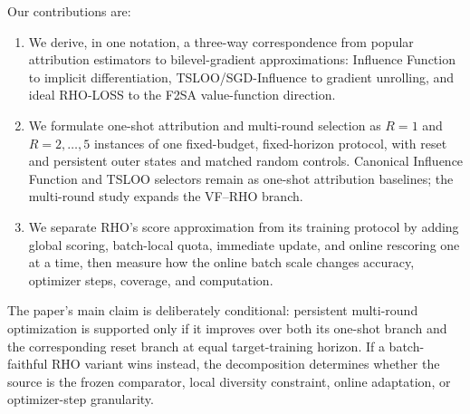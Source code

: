 Our contributions are:
\begin{enumerate}
    \item We derive, in one notation, a three-way correspondence from popular
    attribution estimators to bilevel-gradient approximations: Influence
    Function to implicit differentiation, TSLOO/SGD-Influence to gradient
    unrolling, and ideal RHO-LOSS to the F2SA value-function direction.
    \item We formulate one-shot attribution and multi-round selection as
    $R=1$ and $R=2,\ldots,5$ instances of one fixed-budget, fixed-horizon
    protocol, with reset and persistent outer states and matched random
    controls. Canonical Influence Function and TSLOO selectors remain as
    one-shot attribution baselines; the multi-round study expands the VF--RHO
    branch.
    \item We separate RHO's score approximation from its training protocol by
    adding global scoring, batch-local quota, immediate update, and online
    rescoring one at a time, then measure how the online batch scale changes
    accuracy, optimizer steps, coverage, and computation.
\end{enumerate}
The paper's main claim is deliberately conditional: persistent multi-round
optimization is supported only if it improves over both its one-shot branch
and the corresponding reset branch at equal target-training horizon. If a
batch-faithful RHO variant wins instead, the decomposition determines whether
the source is the frozen comparator, local diversity constraint, online
adaptation, or optimizer-step granularity.

